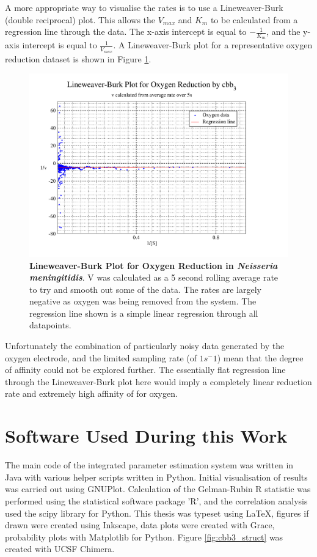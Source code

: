 A more appropriate way to visualise the rates is to use a Lineweaver-Burk (double reciprocal) plot. This allows the $V_{max}$ and $K_m$ to be calculated from a regression line through the data. The x-axis intercept is equal to $-\frac{1}{K_m}$, and the y-axis intercept is equal to $\frac{1}{V_{max}}$. A Lineweaver-Burk plot for a representative oxygen reduction dataset is shown in Figure \ref{fig:o2lb}.
\begin{figure}[ht]
 \centering
 \includegraphics[width=14cm, trim=1cm 1cm 4cm 0.5cm, clip=true]{./appendix/data/lbplot.pdf}
 \caption[{Lineweaver-Burk Plot for Oxygen Reduction in \textit{Neisseria meningitidis}.}]{{\bf Lineweaver-Burk Plot for Oxygen Reduction in \textit{Neisseria meningitidis}}. V was calculated as a 5 second rolling average rate to try and smooth out some of the data. The rates are largely negative as oxygen was being removed from the system. The regression line shown is a simple linear regression through all datapoints.
 \label{fig:o2lb}}
\end{figure}

Unfortunately the combination of particularly noisy data generated by the oxygen electrode, and the limited sampling rate (of $1 s^-1$) mean that the degree of affinity could not be explored further. The essentially flat regression line through the Lineweaver-Burk plot here would imply a completely linear reduction rate and extremely high affinity of \cbbthree{} for oxygen.

\section{Software Used During this Work}
The main code of the integrated parameter estimation system was written in Java\texttrademark{} with various helper scripts written in Python. Initial visualisation of results was carried out using GNUPlot. Calculation of the Gelman-Rubin R statistic was performed using the statistical software package 'R', and the correlation analysis used the scipy library for Python. This thesis was typeset using \LaTeX, figures if drawn were created using Inkscape, data plots were created with Grace, probability plots with Matplotlib\cite{Hunter2007a} for Python. Figure \ref{fig:cbb3_struct} was created with UCSF Chimera\cite{Pettersen2004}.